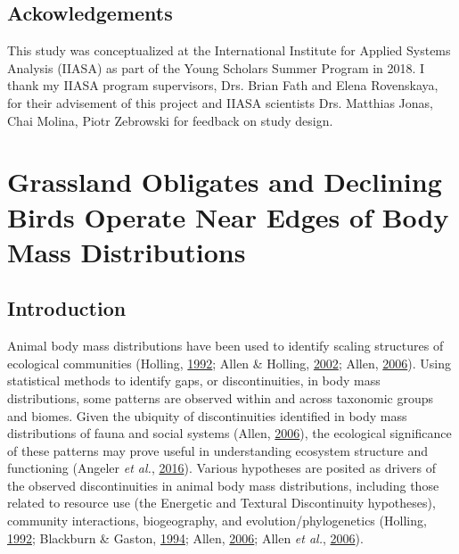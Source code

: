 \documentclass[12pt,twoside,openany]{reedthesis}
\begin{document}
\hypertarget{ackowledgements}{%
\section{Ackowledgements}\label{ackowledgements}}

This study was conceptualized at the International Institute for Applied Systems Analysis (IIASA) as part of the Young Scholars Summer Program in 2018. I thank my IIASA program supervisors, Drs. Brian Fath and Elena Rovenskaya, for their advisement of this project and IIASA scientists Drs. Matthias Jonas, Chai Molina, Piotr Zebrowski for feedback on study design.

\hypertarget{discontinuity}{%
\chapter{Grassland Obligates and Declining Birds Operate Near Edges of Body Mass Distributions}\label{discontinuity}}

\hypertarget{introduction-5}{%
\section{Introduction}\label{introduction-5}}

Animal body mass distributions have been used to identify scaling structures of ecological communities (Holling, \protect\hyperlink{ref-holling1992cross}{1992}; Allen \& Holling, \protect\hyperlink{ref-allen2002cross}{2002}; Allen, \protect\hyperlink{ref-allen2006discontinuities}{2006}). Using statistical methods to identify gaps, or discontinuities, in body mass distributions, some patterns are observed within and across taxonomic groups and biomes. Given the ubiquity of discontinuities identified in body mass distributions of fauna and social systems (Allen, \protect\hyperlink{ref-allen2006discontinuities}{2006}), the ecological significance of these patterns may prove useful in understanding ecosystem structure and functioning (Angeler \emph{et al.}, \protect\hyperlink{ref-angeler2016management}{2016}). Various hypotheses are posited as drivers of the observed discontinuities in animal body mass distributions, including those related to resource use (the Energetic and Textural Discontinuity hypotheses), community interactions, biogeography, and evolution/phylogenetics (Holling, \protect\hyperlink{ref-holling1992cross}{1992}; Blackburn \& Gaston, \protect\hyperlink{ref-blackburn1994animal}{1994}; Allen, \protect\hyperlink{ref-allen2006discontinuities}{2006}; Allen \emph{et al.}, \protect\hyperlink{ref-allen2006patterns}{2006}).
\end{document}
